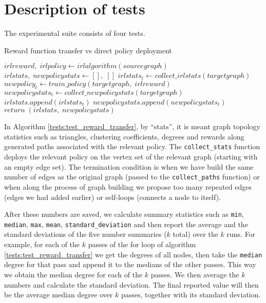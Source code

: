 \documentclass{report}
\numberwithin{equation}{section}
\numberwithin{figure}{section}
\numberwithin{table}{section}
\numberwithin{algorithm}{section}
\begin{document}
\section{Description of tests}
\label{sec:test_description}
The experimental suite consists of four tests.
\begin{algorithm}
  \caption{Reward function transfer vs direct policy deployment}
  \label{tests:test_reward_transfer}
  \begin{algorithmic}
    \State $irlreward,\; irlpolicy \gets irlalgorithm(sourcegraph)$
    \State $irlstats,\; newpolicystats \gets [],\; []$
    \State $irlstats_t \gets collect\_irlstats(targetgraph)$
    \State $newpolicy_t \gets train\_policy(targetgraph,\; irlreward)$
    \State $newpolicystats_t \gets collect\_newpolicystats(targetgraph)$
    \State $irlstats.append(irlstats_t)$
    \State $newpolicystats.append(newpolicystats_t)$
    \EndFor
    \State $return\; (irlstats,\; newpolicystats)$
  \end{algorithmic}
\end{algorithm}
In Algorithm \ref{tests:test_reward_transfer}, by ``stats'', it is meant 
graph topology statistics such as triangles, clustering coefficients, 
degrees and rewards along generated paths associated with the 
relevant policy. The \verb|collect_stats| function deploys the relevant 
policy on the vertex set of the relevant graph (starting with an 
empty edge set). The termination condition is when we have build the same 
number of edges as the original graph (passed to the \verb|collect_paths|
function) or when along the process of graph building we propose 
too many repeated edges (edges we had added earlier) or 
self-loops (connects a node to itself).

After these numbers are saved, we calculate summary 
statistics such as \verb|min|, \verb|median|, \verb|max|, 
\verb|mean|, \verb|standard_deviation| and 
then report the average and the standard deviations of the five number 
summaries ($k$ total) over the $k$ runs. For example, for each of the 
$k$ passes of the for loop of algorithm \ref{tests:test_reward_transfer} 
we get the degrees of all nodes, then take the \verb|median| degree for 
that pass and append it to the medians of the other passes. This way 
we obtain the median degree for each of the $k$ passes. We then average 
the $k$ numbers and calculate the standard deviation. The final reported 
value will then be the average median degree over $k$ passes, together 
with its standard deviation.
\end{document}
